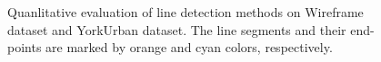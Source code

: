 \documentclass[runningheads]{llncs}
\begin{document}
\begin{figure}[H]
\begin{center}
   \end{center}
    \caption{Quanlitative evaluation of line detection methods on Wireframe dataset and YorkUrban dataset. The line segments and their end-points are marked by orange and cyan colors, respectively.}
    \label{vis_pic}
\end{figure}

\newpage


\end{document}
